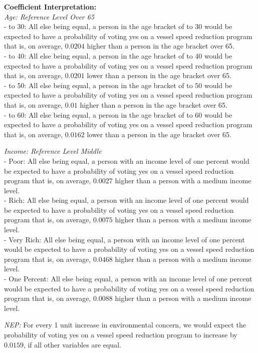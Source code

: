 \documentclass[10pt,]{article}
\begin{document}
\textbf{Coefficient Interpretation:}\\
\emph{Age: Reference Level Over 65}\\
- to 30: All else being equal, a person in the age bracket of to 30
would be expected to have a probability of voting yes on a vessel speed
reduction program that is, on average, \(0.0204\) higher than a person
in the age bracket over 65.\\
- to 40: All else being equal, a person in the age bracket of to 40
would be expected to have a probability of voting yes on a vessel speed
reduction program that is, on average, \(0.0201\) lower than a person in
the age bracket over 65.\\
- to 50: All else being equal, a person in the age bracket of to 50
would be expected to have a probability of voting yes on a vessel speed
reduction program that is, on average, \(0.01\) higher than a person in
the age bracket over 65.\\
- to 60: All else being equal, a person in the age bracket of to 60
would be expected to have a probability of voting yes on a vessel speed
reduction program that is, on average, \(0.0162\) lower than a person in
the age bracket over 65.

\emph{Income: Reference Level Middle}\\
- Poor: All else being equal, a person with an income level of one
percent would be expected to have a probability of voting yes on a
vessel speed reduction program that is, on average, \(0.0027\) higher
than a person with a medium income level.\\
- Rich: All else being equal, a person with an income level of one
percent would be expected to have a probability of voting yes on a
vessel speed reduction program that is, on average, \(0.0075\) higher
than a person with a medium income level.\\
- Very Rich: All else being equal, a person with an income level of one
percent would be expected to have a probability of voting yes on a
vessel speed reduction program that is, on average, \(0.0468\) higher
than a person with a medium income level.\\
- One Percent: All else being equal, a person with an income level of
one percent would be expected to have a probability of voting yes on a
vessel speed reduction program that is, on average, \(0.0088\) higher
than a person with a medium income level.

\emph{NEP:} For every 1 unit increase in environmental concern, we would
expect the probability of voting yes on a vessel speed reduction program
to increase by \(0.0159\), if all other variables are equal.
\end{document}
